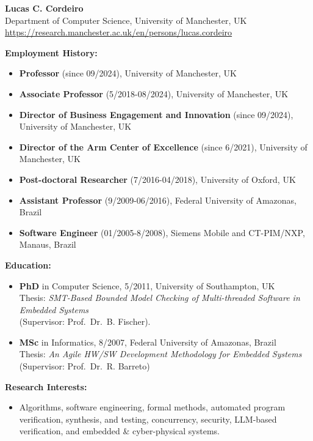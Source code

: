 \documentclass[11pt,letterpaper]{article}
\newenvironment{cvlist}%
  {\begin{itemize}[label={},leftmargin=27.2pt,itemindent=-21.8pt,
                   labelsep=0pt,labelwidth=0pt,itemsep=2pt,parsep=0pt,
                   topsep=4pt,partopsep=0pt]}%
  {\end{itemize}}
\newcommand{\cvsection}[1]{\vspace{7pt}\par\textbf{#1}}
\begin{document}
\begin{center}
{\large\textbf{Lucas C. Cordeiro}}\\
Department of Computer Science, University of Manchester, UK\\
\url{https://research.manchester.ac.uk/en/persons/lucas.cordeiro}
\end{center}

\vspace{-0.3pt}
\textbf{Employment History:}
\begin{cvlist}
\item \textbf{Professor} (since 09/2024), University of Manchester, UK
\item \textbf{Associate Professor} (5/2018-08/2024), University of Manchester, UK
\item \textbf{Director of Business Engagement and Innovation} (since 09/2024), University of Manchester, UK
\item \textbf{Director of the Arm Center of Excellence} (since 6/2021), University of Manchester, UK
\item \textbf{Post-doctoral Researcher} (7/2016-04/2018), University of Oxford, UK
\item \textbf{Assistant Professor} (9/2009-06/2016), Federal University of Amazonas, Brazil
\item \textbf{Software Engineer} (01/2005-8/2008), Siemens Mobile and CT-PIM/NXP, Manaus, Brazil
\end{cvlist}

\cvsection{Education:}
\begin{cvlist}
\item \textbf{PhD} in Computer Science, 5/2011, University of Southampton, UK\\
  Thesis: \emph{SMT-Based Bounded Model Checking of Multi-threaded Software in Embedded Systems}\\
  (Supervisor: Prof.\ Dr.\ B. Fischer).
\item \textbf{MSc} in Informatics, 8/2007, Federal University of Amazonas, Brazil\\
  Thesis: \emph{An Agile HW/SW Development Methodology for Embedded Systems}\\
  (Supervisor: Prof.\ Dr.\ R. Barreto)
\end{cvlist}

\cvsection{Research Interests:}
\begin{cvlist}
\item Algorithms, software engineering, formal methods, automated program verification, synthesis, and testing, con\-currency,
  security, LLM-based verification, and embedded \& cyber-physical systems.
\end{cvlist}
\end{document}
